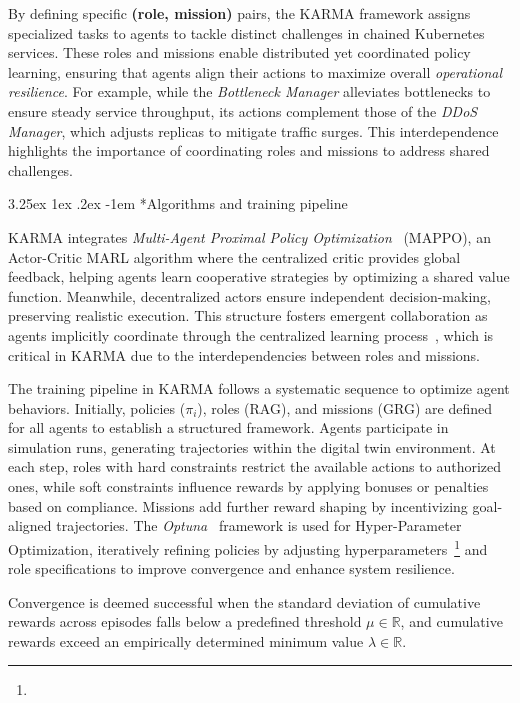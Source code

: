\documentclass[conference]{IEEEtran}
\makeatletter
\renewcommand\paragraph{\@startsection{paragraph}{5}{\z@}%
  {3.25ex \@plus1ex \@minus.2ex}%
  {-1em}%
  {\normalfont\normalsize\bfseries}}
\makeatother
\begin{document}
By defining specific \textbf{(role, mission)} pairs, the KARMA framework assigns specialized tasks to agents to tackle distinct challenges in chained Kubernetes services. These roles and missions enable distributed yet coordinated policy learning, ensuring that agents align their actions to maximize overall \textit{operational resilience}. For example, while the \textit{Bottleneck Manager} alleviates bottlenecks to ensure steady service throughput, its actions complement those of the \textit{DDoS Manager}, which adjusts replicas to mitigate traffic surges. This interdependence highlights the importance of coordinating roles and missions to address shared challenges.

\paragraph*{Algorithms and training pipeline}

KARMA integrates \textit{Multi-Agent Proximal Policy Optimization}~\cite{Yu2022} (MAPPO), an Actor-Critic MARL algorithm where the centralized critic provides global feedback, helping agents learn cooperative strategies by optimizing a shared value function. Meanwhile, decentralized actors ensure independent decision-making, preserving realistic execution. This structure fosters emergent collaboration as agents implicitly coordinate through the centralized learning process~\cite{Yu2022}, which is critical in KARMA due to the interdependencies between roles and missions.

The training pipeline in KARMA follows a systematic sequence to optimize agent behaviors. Initially, policies (\(\pi_i\)), roles (RAG), and missions (GRG) are defined for all agents to establish a structured framework. Agents participate in simulation runs, generating trajectories within the digital twin environment. At each step, roles with hard constraints restrict the available actions to authorized ones, while soft constraints influence rewards by applying bonuses or penalties based on compliance. Missions add further reward shaping by incentivizing goal-aligned trajectories. The \textit{Optuna}~\cite{akiba2019optuna} framework is used for Hyper-Parameter Optimization, iteratively refining policies by adjusting hyperparameters~\footnote{} and role specifications to improve convergence and enhance system resilience.

Convergence is deemed successful when the standard deviation of cumulative rewards across episodes falls below a predefined threshold $\mu \in \mathbb{R}$, and cumulative rewards exceed an empirically determined minimum value $\lambda \in \mathbb{R}$.
\end{document}
